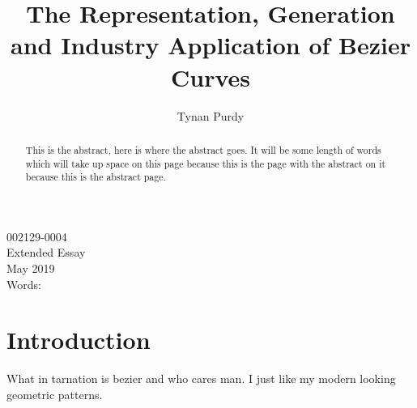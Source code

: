 \documentclass[12pt,letterpaper]{article}
\title{The Representation, Generation and Industry Application of Bezier Curves}
\author{Tynan Purdy}
\date{\vspace{-5ex}}
\begin{document}
\large
\parindent=0.5in
{\fontsize{12}{14.4}
	{\singlespace
	\maketitle
	\begin{center}
	\vspace{4mm}
	002129-0004 \\
	\vspace{4mm}
	Extended Essay \\
	\vspace{4mm}
	May 2019 \\
	\vspace{4mm}
	Words: \\
	\end{center}
	}
}	

\newpage

\begin{abstract}
This is the abstract, here is where the abstract goes. It will be some length of words which will take up space on this page because this is the page with the abstract on it because this is the abstract page.
\end{abstract}

\newpage
\tableofcontents

\newpage
\section{Introduction}
What in tarnation is bezier and who cares man. I just like my modern looking geometric patterns.

\appendix
%
\end{document}
